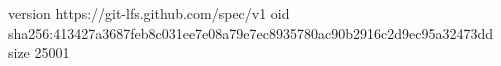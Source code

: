 version https://git-lfs.github.com/spec/v1
oid sha256:413427a3687feb8c031ee7e08a79e7ec8935780ac90b2916c2d9ec95a32473dd
size 25001
